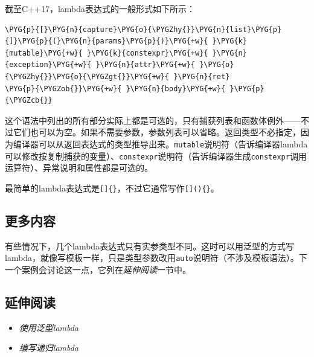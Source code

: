 
截至C++17，lambda表达式的一般形式如下所示：



\begin{codeblockbg}
\begin{Verbatim}[commandchars=\\\{\},breaklines=true,breakanywhere=true,fontsize=\codefont,xleftmargin=17bp]
\PYG{p}{[}\PYG{n}{capture}\PYG{o}{\PYGZhy{}}\PYG{n}{list}\PYG{p}{]}\PYG{p}{(}\PYG{n}{params}\PYG{p}{)}\PYG{+w}{ }\PYG{k}{mutable}\PYG{+w}{ }\PYG{k}{constexpr}\PYG{+w}{ }\PYG{n}{exception}\PYG{+w}{ }\PYG{n}{attr}\PYG{+w}{ }\PYG{o}{\PYGZhy{}}\PYG{o}{\PYGZgt{}}\PYG{+w}{ }\PYG{n}{ret}
\PYG{p}{\PYGZob{}}\PYG{+w}{ }\PYG{n}{body}\PYG{+w}{ }\PYG{p}{\PYGZcb{}}
\end{Verbatim}
\end{codeblockbg}



这个语法中列出的所有部分实际上都是可选的，只有捕获列表和函数体例外——不过它们也可以为空。如果不需要参数，参数列表可以省略。返回类型不必指定，因为编译器可以从返回表达式的类型推导出来。\texttt{mutable}说明符（告诉编译器lambda可以修改按复制捕获的变量）、\texttt{constexpr}说明符（告诉编译器生成\texttt{constexpr}调用运算符）、异常说明和属性都是可选的。



\begin{myNote}
最简单的lambda表达式是\texttt{[]\{\}}，不过它通常写作\texttt{[]()\{\}}。
\end{myNote}



\subsection{更多内容}



有些情况下，几个lambda表达式只有实参类型不同。这时可以用泛型的方式写lambda，就像写模板一样，只是类型参数改用\texttt{auto}说明符（不涉及模板语法）。下一个案例会讨论这一点，它列在\textit{延伸阅读}一节中。



\subsection{延伸阅读}



\begin{itemize}
\item \textit{使用泛型lambda}



\item \textit{编写递归lambda}

\end{itemize}


